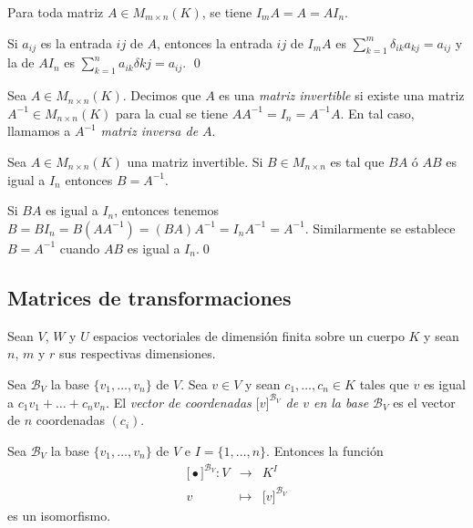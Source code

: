 \begin{pro}
Para toda matriz $A\in M_{m\times n}(K)$, se tiene $I_mA=A=AI_n$.
\end{pro}

\dem Si $a_{ij}$ es la entrada $ij$ de $A$, entonces la entrada $ij$ de $I_mA$ es $\sum_{k=1}^m \delta_{ik}a_{kj}=a_{ij}$ y la de $AI_n$ es $\sum_{k=1}^na_{ik}\delta{kj}=a_{ij}$. \qed

\begin{defn}
Sea $A\in M_{n\times n}(K)$. Decimos que $A$ es una \emph{matriz invertible} si existe una matriz $A^{-1}\in M_{n\times n}(K)$ para la cual se tiene $AA^{-1}=I_n=A^{-1}A$. En tal caso, llamamos a $A^{-1}$ \emph{matriz inversa de $A$}.
\end{defn}

\begin{pro}
Sea $A\in M_{n\times n}(K)$ una matriz invertible. Si $B\in M_{n\times n}$ es tal que $BA$ \'o $AB$ es igual a $I_n$ entonces $B=A^{-1}$.
\end{pro}

\dem Si $BA$ es igual a $I_n$, entonces tenemos $B=BI_n=B(AA^{-1})=(BA)A^{-1}=I_nA^{-1}=A^{-1}$. Similarmente se establece $B=A^{-1}$ cuando $AB$ es igual a $I_n$.\qed

\subsection*{Matrices de transformaciones}

Sean $V$, $W$ y $U$ espacios vectoriales de dimensi\'on finita sobre un cuerpo $K$ y sean $n$, $m$ y $r$ sus respectivas dimensiones.

\begin{defn}
Sea $\mathcal{B}_V$ la base $\{v_1,\ldots,v_n\}$ de $V$. Sea $v\in V$ y sean $c_1,\ldots,c_n\in K$ tales que $v$ es igual a $c_1v_1+\ldots+c_nv_n.$
El \emph{vector de coordenadas $\Big[ v \Big]^{\mathcal{B}_V}$ de $v$ en la base $\mathcal{B}_V$} es el vector de $n$ coordenadas $(c_i)$.
\end{defn}

\begin{prop}
Sea $\mathcal{B}_V$ la base $\{v_1,\ldots,v_n\}$ de $V$ e $I=\{1,\ldots,n\}$. Entonces la funci\'on
\begin{eqnarray*}
\Big[ \bullet \Big]^{\mathcal{B}_V}: V & \longrightarrow & K^I\\
v & \longmapsto & \Big[ v \Big]^{\mathcal{B}_V}
\end{eqnarray*}
es un isomorfismo.
\end{prop}

